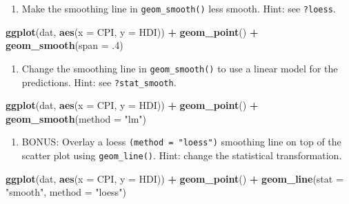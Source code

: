 \documentclass[
]{book}
\newenvironment{Shaded}{\begin{snugshade}}{\end{snugshade}}
\newcommand{\DataTypeTok}[1]{\textcolor[rgb]{0.13,0.29,0.53}{#1}}
\newcommand{\FloatTok}[1]{\textcolor[rgb]{0.00,0.00,0.81}{#1}}
\newcommand{\KeywordTok}[1]{\textcolor[rgb]{0.13,0.29,0.53}{\textbf{#1}}}
\newcommand{\NormalTok}[1]{#1}
\newcommand{\OperatorTok}[1]{\textcolor[rgb]{0.81,0.36,0.00}{\textbf{#1}}}
\newcommand{\StringTok}[1]{\textcolor[rgb]{0.31,0.60,0.02}{#1}}
\providecommand{\tightlist}{%
  \setlength{\itemsep}{0pt}\setlength{\parskip}{0pt}}
\begin{document}
\begin{enumerate}
\def\labelenumi{\arabic{enumi}.}
\setcounter{enumi}{2}
\tightlist
\item
  Make the smoothing line in \texttt{geom\_smooth()} less smooth. Hint: see \texttt{?loess}.
\end{enumerate}

\begin{Shaded}
\begin{Highlighting}[]
\KeywordTok{ggplot}\NormalTok{(dat, }\KeywordTok{aes}\NormalTok{(}\DataTypeTok{x =}\NormalTok{ CPI, }\DataTypeTok{y =}\NormalTok{ HDI)) }\OperatorTok{+}
\StringTok{  }\KeywordTok{geom_point}\NormalTok{() }\OperatorTok{+}
\StringTok{  }\KeywordTok{geom_smooth}\NormalTok{(}\DataTypeTok{span =} \FloatTok{.4}\NormalTok{)}
\end{Highlighting}
\end{Shaded}

\begin{enumerate}
\def\labelenumi{\arabic{enumi}.}
\setcounter{enumi}{3}
\tightlist
\item
  Change the smoothing line in \texttt{geom\_smooth()} to use a linear model for the predictions. Hint: see \texttt{?stat\_smooth}.
\end{enumerate}

\begin{Shaded}
\begin{Highlighting}[]
\KeywordTok{ggplot}\NormalTok{(dat, }\KeywordTok{aes}\NormalTok{(}\DataTypeTok{x =}\NormalTok{ CPI, }\DataTypeTok{y =}\NormalTok{ HDI)) }\OperatorTok{+}
\StringTok{  }\KeywordTok{geom_point}\NormalTok{() }\OperatorTok{+}
\StringTok{  }\KeywordTok{geom_smooth}\NormalTok{(}\DataTypeTok{method =} \StringTok{"lm"}\NormalTok{)}
\end{Highlighting}
\end{Shaded}

\begin{enumerate}
\def\labelenumi{\arabic{enumi}.}
\setcounter{enumi}{4}
\tightlist
\item
  BONUS: Overlay a loess \texttt{(method\ =\ "loess")} smoothing line on top of the scatter plot using \texttt{geom\_line()}. Hint: change the statistical transformation.
\end{enumerate}

\begin{Shaded}
\begin{Highlighting}[]
\KeywordTok{ggplot}\NormalTok{(dat, }\KeywordTok{aes}\NormalTok{(}\DataTypeTok{x =}\NormalTok{ CPI, }\DataTypeTok{y =}\NormalTok{ HDI)) }\OperatorTok{+}
\StringTok{  }\KeywordTok{geom_point}\NormalTok{() }\OperatorTok{+}
\StringTok{  }\KeywordTok{geom_line}\NormalTok{(}\DataTypeTok{stat =} \StringTok{"smooth"}\NormalTok{, }\DataTypeTok{method =} \StringTok{"loess"}\NormalTok{)}
\end{Highlighting}
\end{Shaded}
\end{document}
